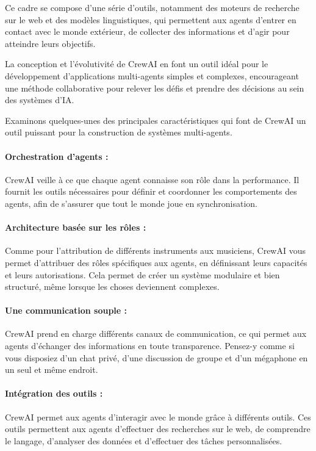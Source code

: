 \noindent
Ce cadre se compose d'une série d'outils, notamment des moteurs de recherche sur le web et des modèles linguistiques, qui permettent aux agents d'entrer en contact avec le monde extérieur, de collecter des informations et d'agir pour atteindre leurs objectifs.

\medskip

\noindent
La conception et l'évolutivité de CrewAI en font un outil idéal pour le développement d'applications multi-agents simples et complexes, encourageant une méthode collaborative pour relever les défis et prendre des décisions au sein des systèmes d'IA.

\medskip

\noindent
Examinons quelques-unes des principales caractéristiques qui font de CrewAI un outil puissant pour la construction de systèmes multi-agents.

\paragraph{\textbf{Orchestration d'agents :}} CrewAI veille à ce que chaque agent connaisse son rôle dans la performance. Il fournit les outils nécessaires pour définir et coordonner les comportements des agents, afin de s'assurer que tout le monde joue en synchronisation.

\paragraph{\textbf{Architecture basée sur les rôles :}} Comme pour l'attribution de différents instruments aux musiciens, CrewAI vous permet d'attribuer des rôles spécifiques aux agents, en définissant leurs capacités et leurs autorisations. Cela permet de créer un système modulaire et bien structuré, même lorsque les choses deviennent complexes.

\paragraph{\textbf{Une communication souple :}} CrewAI prend en charge différents canaux de communication, ce qui permet aux agents d'échanger des informations en toute transparence. Pensez-y comme si vous disposiez d'un chat privé, d'une discussion de groupe et d'un mégaphone en un seul et même endroit.

\paragraph{\textbf{Intégration des outils :}} CrewAI permet aux agents d'interagir avec le monde grâce à différents outils. Ces outils permettent aux agents d'effectuer des recherches sur le web, de comprendre le langage, d'analyser des données et d'effectuer des tâches personnalisées.

